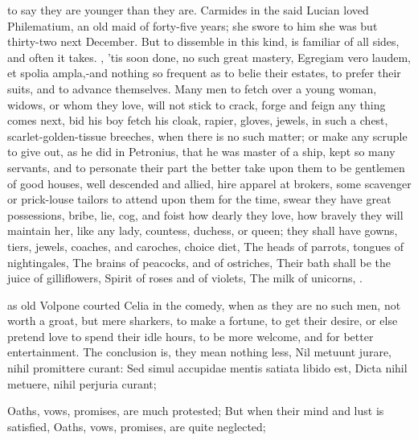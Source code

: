 to say they are younger than they are. Carmides in the said Lucian
loved Philematium, an old maid of forty-five years; she swore to
him she was but thirty-two next December. But to dissemble in this
kind, is familiar of all sides, and often it takes. , 'tis soon done, no such great
mastery, Egregiam vero laudem, et spolia ampla,-and nothing so frequent
as to belie their estates, to prefer their suits, and to advance
themselves. Many men to fetch over a young woman, widows, or whom they
love, will not stick to crack, forge and feign any thing comes next,
bid his boy fetch his cloak, rapier, gloves, jewels, \etc{} in such a
chest, scarlet-golden-tissue breeches, \etc{} when there is no such
matter; or make any scruple to give out, as he did in Petronius, that
he was master of a ship, kept so many servants, and to personate their
part the better take upon them to be gentlemen of good houses, well
descended and allied, hire apparel at brokers, some scavenger or
prick-louse tailors to attend upon them for the time, swear they have
great possessions, bribe, lie, cog, and foist how dearly they
love, how bravely they will maintain her, like any lady, countess,
duchess, or queen; they shall have gowns, tiers, jewels, coaches, and
caroches, choice diet,
The heads of parrots, tongues of nightingales,
The brains of peacocks, and of ostriches,
Their bath shall be the juice of gilliflowers,
Spirit of roses and of violets,
The milk of unicorns, \etc{}.

as old Volpone courted Celia in the comedy, when as they are no
such men, not worth a groat, but mere sharkers, to make a fortune, to
get their desire, or else pretend love to spend their idle hours, to be
more welcome, and for better entertainment. The conclusion is, they
mean nothing less,
Nil metuunt jurare, nihil promittere curant:
Sed simul accupidae mentis satiata libido est,
Dicta nihil metuere, nihil perjuria curant;

Oaths, vows, promises, are much protested;
But when their mind and lust is satisfied,
Oaths, vows, promises, are quite neglected;

